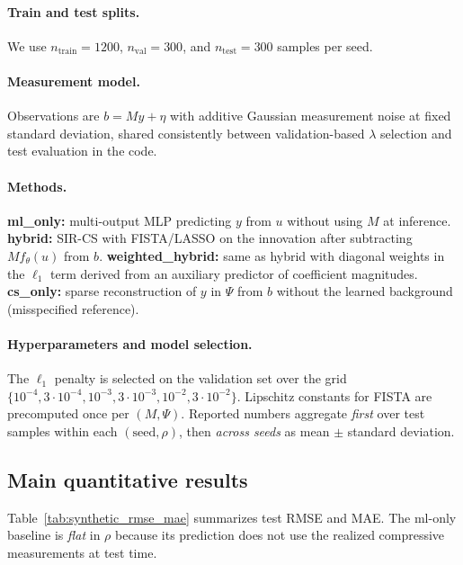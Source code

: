 \paragraph{Train and test splits.}
We use $n_{\mathrm{train}}=1200$, $n_{\mathrm{val}}=300$, and $n_{\mathrm{test}}=300$ samples per seed.

\paragraph{Measurement model.}
Observations are $b = M y + \eta$ with additive Gaussian measurement noise at fixed standard deviation, shared consistently between validation-based $\lambda$ selection and test evaluation in the code.

\paragraph{Methods.}
\textbf{ml\_only:} multi-output MLP predicting $y$ from $u$ without using $M$ at inference.
\textbf{hybrid:} SIR-CS with FISTA/LASSO on the innovation after subtracting $M f_\theta(u)$ from $b$.
\textbf{weighted\_hybrid:} same as hybrid with diagonal weights in the $\ell_1$ term derived from an auxiliary predictor of coefficient magnitudes.
\textbf{cs\_only:} sparse reconstruction of $y$ in $\Psi$ from $b$ without the learned background (misspecified reference).

\paragraph{Hyperparameters and model selection.}
The $\ell_1$ penalty is selected on the validation set over the grid
$\{10^{-4},3\!\cdot\!10^{-4},10^{-3},3\!\cdot\!10^{-3},10^{-2},3\!\cdot\!10^{-2}\}$.
Lipschitz constants for FISTA are precomputed once per $(M,\Psi)$.
Reported numbers aggregate \emph{first} over test samples within each $(\mathrm{seed},\rho)$, then \emph{across seeds} as mean $\pm$ standard deviation.

\subsection{Main quantitative results}
\label{sec:exp_main_table}

Table~\ref{tab:synthetic_rmse_mae} summarizes test RMSE and MAE.
The ml-only baseline is \emph{flat} in $\rho$ because its prediction does not use the realized compressive measurements at test time.

